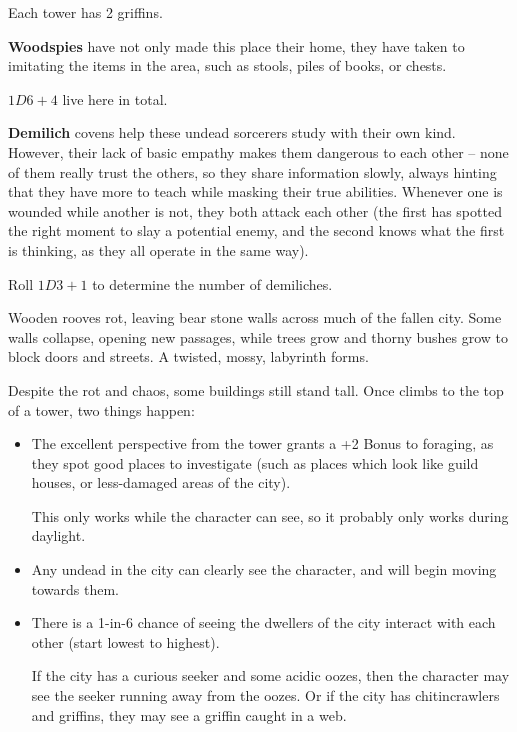 \begin{multicols}{2}
\begin{dlist}
  Each tower has 2 griffins.
  \item
  \textbf{Woodspies} have not only made this place their home, they have taken to imitating the items in the area, such as stools, piles of books, or chests.

  $1D6+4$ live here in total.
  \item\label{lostDemilich}
  \textbf{Demilich} covens help these undead sorcerers study with their own kind.
  However, their lack of basic empathy makes them dangerous to each other -- none of them really trust the others, so they share information slowly, always hinting that they have more to teach while masking their true abilities.
  Whenever one is wounded while another is not, they both attack each other (the first has spotted the right moment to slay a potential enemy, and the second knows what the first is thinking, as they all operate in the same way).

  Roll $1D3 + 1$ to determine the number of demiliches.
\end{dlist}

\label{lostTowers}

Wooden rooves rot, leaving bear stone walls across much of the fallen city.
Some walls collapse, opening new passages, while trees grow and thorny bushes grow to block doors and streets.
A twisted, mossy, labyrinth forms.

Despite the rot and chaos, some buildings still stand tall.
Once  climbs to the top of a tower, two things happen:


\begin{itemize}
  \item
  The excellent perspective from the tower grants a +2 Bonus to foraging, as they spot good places to investigate (such as places which look like guild houses, or less-damaged areas of the city).

  This only works while the character can see, so it probably only works during daylight.
  \item
  Any undead in the city can clearly see the character, and will begin moving towards them.
  \item
  There is a 1-in-6 chance of seeing the dwellers of the city interact with each other (start lowest to highest).

  If the city has a curious \gls{seeker} and some acidic oozes, then the character may see the \gls{seeker} running away from the oozes.
  Or if the city has chitincrawlers and griffins, they may see a griffin caught in a web.
\end{itemize}


\end{multicols}
